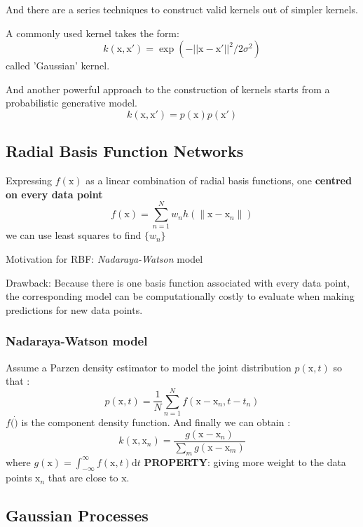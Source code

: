 \documentclass[a4paper]{book}
\begin{document}
And there are a series techniques to construct valid kernels out of simpler kernels.

A commonly used kernel takes the form:
$$k(\mathrm  x,\mathrm  x') = \exp(-||\mathrm  x-\mathrm  x'||^2/2\sigma^2)$$
called 'Gaussian' kernel.

And another powerful approach to the construction of kernels starts from a probabilistic generative model.  $$k(\mathrm  x,\mathrm x') = p(\mathrm  x)p(\mathrm  x')$$
\subsection{Radial Basis Function Networks}
Expressing $f(\mathrm{x})$ as a linear combination of radial basis functions, one \textbf{centred on every data point}
\begin{equation}
  f(\mathrm{x})  = \sum_{n=1}^{N}w_nh(\parallel\mathrm{x}-\mathrm{x}_n\parallel)
\end{equation}
we can use least squares to find $\{w_n\}$

Motivation for RBF:   \textit{Nadaraya-Watson} model

Drawback: Because there is one basis function associated with every data point, the corresponding model can be computationally costly to evaluate when making predictions for new data points.
\subsubsection{ Nadaraya-Watson model}
Assume a Parzen density estimator to model the joint distribution $p(\mathrm x, t) $ so that :
\begin{equation}
p(\mathrm x,t) = \frac1N\sum_{n=1}^{N}f(\mathrm x-\mathrm x_n,t-t_n)
\end{equation}
$f(\dot)$ is the component density function. And finally we can obtain :
\begin{equation}
k(\mathrm x,\mathrm x_n) = \frac{g(\mathrm x-\mathrm x_n)}{\sum_mg(\mathrm x-\mathrm x_m)}
\end{equation}
where $g(\mathrm x) = \int_{-\infty}^{\infty}f(\mathrm x,t)\mathrm dt$
\textbf{PROPERTY}:  giving more weight to the data points $\mathrm x_n$ that are close to $\mathrm x$.
\subsection{Gaussian Processes}
\end{document}
